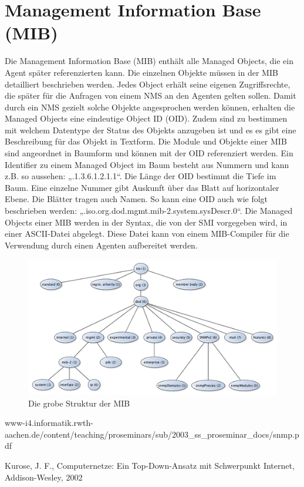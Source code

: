 \documentclass[11pt,a4paper]{article}
\begin{document}
\section*{Management Information Base (MIB)}
Die Management Information Base (MIB) enthält alle Managed Objects, die ein Agent später referenzierten kann. Die einzelnen Objekte müssen in der MIB detailliert beschrieben werden. Jedes Object erhält seine eigenen Zugriffsrechte, die später für die Anfragen von einem NMS an den Agenten gelten sollen. Damit durch ein NMS gezielt solche Objekte angesprochen werden können, erhalten die Managed Objects eine eindeutige Object ID (OID). Zudem sind zu bestimmen mit welchem Datentype der Status des Objekts anzugeben ist und es es gibt eine Beschreibung für das Objekt in Textform.
Die Module und Objekte einer MIB sind angeordnet in Baumform und können mit der OID referenziert werden. Ein Identifier zu einem Managed Object im Baum besteht aus Nummern und kann z.B. so aussehen: „.1.3.6.1.2.1.1“. Die Länge der OID bestimmt die Tiefe im Baum. Eine einzelne Nummer gibt Auskunft über das Blatt auf horizontaler Ebene. Die Blätter tragen auch Namen. So kann eine OID auch wie folgt beschrieben werden: „.iso.org.dod.mgmt.mib-2.system.sysDescr.0“.
Die Managed Objects einer MIB werden in der Syntax, die von der SMI vorgegeben wird, in einer ASCII-Datei abgelegt. Diese Datei kann von einem MIB-Compiler für die Verwendung durch einen Agenten aufbereitet werden.
\linebreak
\begin{figure}[h]
	\centering
	\includegraphics[scale=1]{Bilder/MIB.png}
	\caption{Die grobe Struktur der MIB}
\end{figure}
\linebreak

\pagebreak
\begin{thebibliography}{10}
	\begin{small}
		www-i4.informatik.rwth-aachen.de/content/teaching/proseminars/sub/2003\_ss\_proseminar\_docs/snmp.pdf
	\end{small}
		Kurose, J. F.,
		Computernetze: Ein Top-Down-Ansatz mit Schwerpunkt Internet,
		Addison-Wesley,
		2002
\end{thebibliography}
\end{document}
